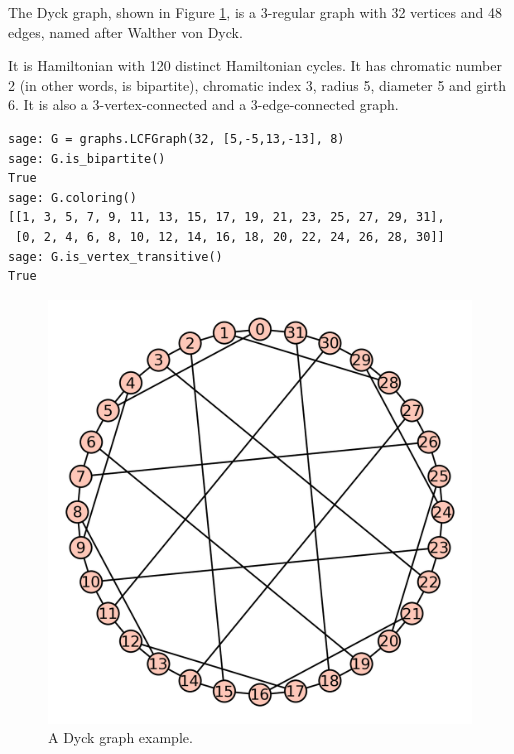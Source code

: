 \begin{example}
\label{example:graph-coloring:dyck-graph-example}
The Dyck graph, shown in Figure \ref{fig:graph-coloring:dyck-graph-example},
is a 3-regular graph with 32 vertices and 48 edges, 
named after Walther von Dyck.

It is Hamiltonian with 120 distinct Hamiltonian cycles. It has
chromatic number 2 (in other words, is bipartite), 
chromatic index 3, radius 5, diameter 5 and girth
6. It is also a 3-vertex-connected and a 3-edge-connected graph.

\begin{lstlisting}
sage: G = graphs.LCFGraph(32, [5,-5,13,-13], 8) 
sage: G.is_bipartite()
True
sage: G.coloring()
[[1, 3, 5, 7, 9, 11, 13, 15, 17, 19, 21, 23, 25, 27, 29, 31], 
 [0, 2, 4, 6, 8, 10, 12, 14, 16, 18, 20, 22, 24, 26, 28, 30]]
sage: G.is_vertex_transitive()
True
\end{lstlisting}


\begin{figure}[!htbp]
\centering
{}
\includegraphics{image/graph-coloring/dyck-graph-example}
\caption{A Dyck graph example.}
\label{fig:graph-coloring:dyck-graph-example}
\end{figure}

\end{example}


